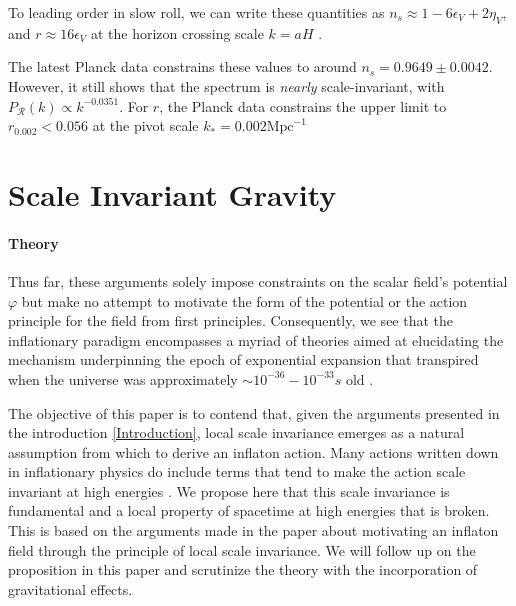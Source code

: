 \documentclass[aps,prd,reprint,preprintnumbers,showpacs,floatfix,nofootinbib,superscript address]{revtex4-2}
\newcommand{\wb}[1]{{\color[RGB]{255,0,0}{\textbf{\textit{[WB: #1]}}}}}
\begin{document}
To leading order in slow roll, we can write these quantities as $n_s \approx 1 -6\epsilon_V +2\eta_V$, and  $r \approx 16 \epsilon_V$ at the horizon crossing scale $k = aH$ \cite{baumann2012tasilecturesinflation, liddle_cosmological_2000}.

The latest Planck data \cite{collaboration_planck_2020} constrains these values to around $n_s = 0.9649 \pm 0.0042$. However, it still shows that the spectrum is \textit{nearly} scale-invariant, with $P_\mathcal{R}(k) \propto k^{-0.0351}$. For $r$, the Planck data constrains the upper limit to $r_{0.002} < 0.056$ at the pivot scale $k_* =0.002 \text{Mpc}^{-1}$


\section{Scale Invariant Gravity} \label{Scale Invariant Gravity}
\paragraph*{Theory}
Thus far, these arguments solely impose constraints on the scalar field's potential $\varphi$ but make no attempt to motivate the form of the potential or the action principle for the field from first principles. Consequently, we see that the inflationary paradigm encompasses a myriad of theories aimed at elucidating the mechanism underpinning the epoch of exponential expansion that transpired when the universe was approximately $\sim 10^{-36} - 10^{-33}s$ old \cite{Mukhanov:2005sc, Baumann_2022}.

The objective of this paper is to contend that, given the arguments presented in the introduction \cref{Introduction}, local scale invariance emerges as a natural assumption from which to derive an inflaton action. Many actions written down in inflationary physics do include terms that tend to make the action scale invariant at high energies \cite{STAROBINSKY198099, karananas_geometrical_2016, Salvio_2022, Karananas:2025xcv, ferreira_inflation_2018, ferreira_inertial_2018, ferreira_weyl_2017, csaki_inflation_2014, rubio_emergent_2017}. We propose here that this scale invariance is fundamental and a local property of spacetime at high energies that is broken. This is based on the arguments made in the paper \cite{barker2024poincaregaugetheoryconformal} about motivating an inflaton field through the principle of local scale invariance. We will follow up on the proposition in this paper and scrutinize the theory with the incorporation of gravitational effects.

\end{document}
